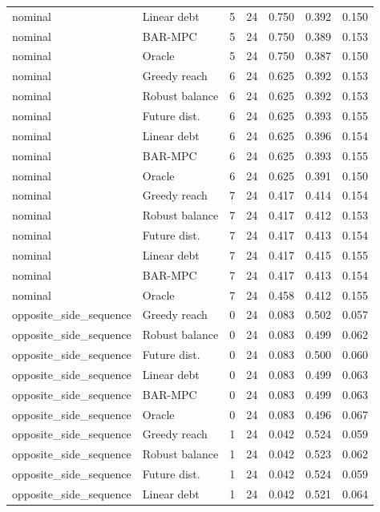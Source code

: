 \begin{longtable}{llrrrrr}
nominal & Linear debt & 5 & 24 & 0.750 & 0.392 & 0.150 \\
nominal & BAR-MPC & 5 & 24 & 0.750 & 0.389 & 0.153 \\
nominal & Oracle & 5 & 24 & 0.750 & 0.387 & 0.150 \\
nominal & Greedy reach & 6 & 24 & 0.625 & 0.392 & 0.153 \\
nominal & Robust balance & 6 & 24 & 0.625 & 0.392 & 0.153 \\
nominal & Future dist. & 6 & 24 & 0.625 & 0.393 & 0.155 \\
nominal & Linear debt & 6 & 24 & 0.625 & 0.396 & 0.154 \\
nominal & BAR-MPC & 6 & 24 & 0.625 & 0.393 & 0.155 \\
nominal & Oracle & 6 & 24 & 0.625 & 0.391 & 0.150 \\
nominal & Greedy reach & 7 & 24 & 0.417 & 0.414 & 0.154 \\
nominal & Robust balance & 7 & 24 & 0.417 & 0.412 & 0.153 \\
nominal & Future dist. & 7 & 24 & 0.417 & 0.413 & 0.154 \\
nominal & Linear debt & 7 & 24 & 0.417 & 0.415 & 0.155 \\
nominal & BAR-MPC & 7 & 24 & 0.417 & 0.413 & 0.154 \\
nominal & Oracle & 7 & 24 & 0.458 & 0.412 & 0.155 \\
opposite\_side\_sequence & Greedy reach & 0 & 24 & 0.083 & 0.502 & 0.057 \\
opposite\_side\_sequence & Robust balance & 0 & 24 & 0.083 & 0.499 & 0.062 \\
opposite\_side\_sequence & Future dist. & 0 & 24 & 0.083 & 0.500 & 0.060 \\
opposite\_side\_sequence & Linear debt & 0 & 24 & 0.083 & 0.499 & 0.063 \\
opposite\_side\_sequence & BAR-MPC & 0 & 24 & 0.083 & 0.499 & 0.063 \\
opposite\_side\_sequence & Oracle & 0 & 24 & 0.083 & 0.496 & 0.067 \\
opposite\_side\_sequence & Greedy reach & 1 & 24 & 0.042 & 0.524 & 0.059 \\
opposite\_side\_sequence & Robust balance & 1 & 24 & 0.042 & 0.523 & 0.062 \\
opposite\_side\_sequence & Future dist. & 1 & 24 & 0.042 & 0.524 & 0.059 \\
opposite\_side\_sequence & Linear debt & 1 & 24 & 0.042 & 0.521 & 0.064 \\

\end{longtable}

